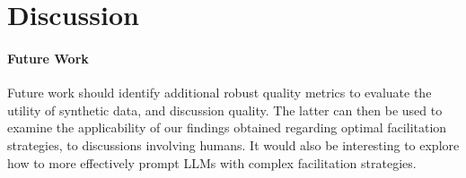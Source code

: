 %
\section{Discussion}
\paragraph{Future Work}Future work should identify additional robust quality metrics to evaluate the utility of synthetic data, and discussion quality. The latter can then be used to examine the applicability of our findings obtained regarding optimal facilitation strategies, to discussions involving humans. It would also be interesting to explore how to more effectively prompt LLMs with complex facilitation strategies.